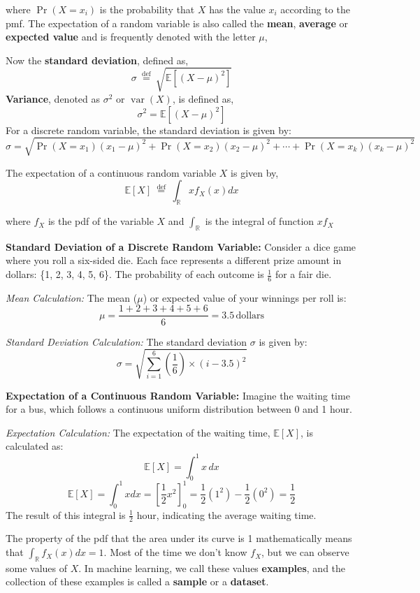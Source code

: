 where \(\operatorname{Pr}\left(X=x_{i}\right)\) is the probability that \(X\) has the value \(x_{i}\) according to the pmf. The expectation of a random variable is also called the \textbf{mean}, \textbf{average} or \textbf{expected value} and is frequently denoted with the letter \(\mu\),

Now the \textbf{standard deviation}, defined as,
$$
	\sigma \stackrel{\text { def }}{=} \sqrt{\mathbb{E}\left[(X-\mu)^{2}\right]}
$$
\textbf{Variance}, denoted as \(\sigma^{2}\) or \(\operatorname{var}(X)\), is defined as,
$$
	\sigma^{2}=\mathbb{E}\left[(X-\mu)^{2}\right]
$$
For a discrete random variable, the standard deviation is given by:
$$
	\sigma=\sqrt{\operatorname{Pr}\left(X=x_{1}\right)\left(x_{1}-\mu\right)^{2}+\operatorname{Pr}\left(X=x_{2}\right)\left(x_{2}-\mu\right)^{2}+\cdots+\operatorname{Pr}\left(X=x_{k}\right)\left(x_{k}-\mu\right)^{2}}
$$

The expectation of a continuous random variable \(X\) is given by,
\begin{equation}
	\mathbb{E}[X] \stackrel{\text { def }}{=} \int_{\mathbb{R}} x f_{X}(x) d x
	\label{notation:2}
\end{equation}

where \(f_{X}\) is the pdf of the variable \(X\) and \(\int_{\mathbb{R}}\) is the integral of function \(x f_{X}\)
\begin{tcolorbox}[enhanced jigsaw, breakable, pad at break*=1mm, colback=gray!20!white, colframe=black!85!black, title=\textbf{Real-Life Examples of Probability Concepts}]

	\textbf{Standard Deviation of a Discrete Random Variable:}
	Consider a dice game where you roll a six-sided die. Each face represents a different prize amount in dollars: \{1, 2, 3, 4, 5, 6\}. The probability of each outcome is \( \frac{1}{6} \) for a fair die.

	\textit{Mean Calculation:}
	The mean (\( \mu \)) or expected value of your winnings per roll is:
	\[ \mu = \frac{1+2+3+4+5+6}{6} = 3.5 \, \text{dollars} \]

	\textit{Standard Deviation Calculation:}
	The standard deviation \( \sigma \) is given by:
	\[ \sigma = \sqrt{\sum_{i=1}^{6} \left(\frac{1}{6}\right) \times (i - 3.5)^2} \]

	\textbf{Expectation of a Continuous Random Variable:}
	Imagine the waiting time for a bus, which follows a continuous uniform distribution between 0 and 1 hour.

	\textit{Expectation Calculation:}
	The expectation of the waiting time, \( \mathbb{E}[X] \), is calculated as:
	\[ \mathbb{E}[X] = \int_{0}^{1} x \, dx \]
	$$
		\mathbb{E}[X]=\int_{0}^{1} x d x=\left[\frac{1}{2} x^{2}\right]_{0}^{1}=\frac{1}{2}\left(1^{2}\right)-\frac{1}{2}\left(0^{2}\right)=\frac{1}{2}
	$$
	The result of this integral is \( \frac{1}{2} \) hour, indicating the average waiting time.
\end{tcolorbox}
The property of the pdf that the area under its curve is 1 mathematically means that \(\int_{\mathbb{R}} f_{X}(x) d x=1\). Most of the time we don't know \(f_{X}\), but we can observe some values of \(X\). In machine learning, we call these values \textbf{examples}, and the collection of these examples is called a \textbf{sample} or a \textbf{dataset}.

